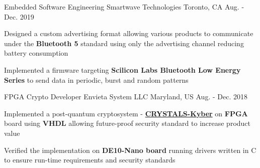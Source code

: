 

\begin{cventries}

\cventry
{Embedded Software Engineering} %
{Smartwave Technologies} %
{Toronto, CA} %
{Aug. - Dec. 2019} %
{ %
\begin{cvitems}
\item {
    Designed a custom advertising format allowing
    various products to communicate under the 
    \textbf{Bluetooth 5} standard using only the advertising channel
    reducing battery consumption 
}
\item {
    Implemented a firmware targeting
    \textbf{Scilicon Labs Bluetooth Low Energy Series}
    to send data in periodic, burst and random patterns
}
\end{cvitems}
}

\cventry
{FPGA Crypto Developer} %
{Envieta System LLC} %
{Maryland, US} %
{Aug. - Dec. 2018} %
{ %
\begin{cvitems}
\item {
    Implemented a post-quantum cryptosystem - 
    \textbf{\href{https://pq-crystals.org/}{CRYSTALS-Kyber}} 
    on \textbf{FPGA} board using \textbf{VHDL} allowing
    future-proof security standard to increase product value
}
\item {
    Verified the implementation on 
    \textbf{DE10-Nano board} running drivers 
    written in C to ensure run-time requirements 
    and security standards
}
\end{cvitems}
}


\end{cventries}
